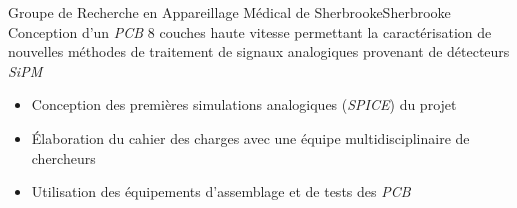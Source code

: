 
{Groupe de Recherche en Appareillage Médical de Sherbrooke}{Sherbrooke}
{Conception d'un \textit{PCB} 8 couches haute vitesse permettant la caractérisation de nouvelles méthodes de traitement de signaux analogiques provenant de détecteurs \textit{SiPM}}
{\vspace{-12pt}
\begin{itemize}
        \item Conception des premières simulations analogiques (\textit{SPICE}) du projet
        \item Élaboration du cahier des charges avec une équipe multidisciplinaire de chercheurs
        \item Utilisation des équipements d'assemblage et de tests des \textit{PCB}
\end{itemize}}


